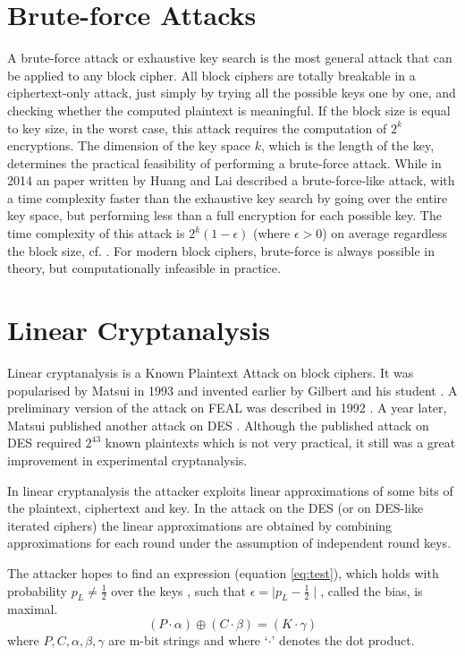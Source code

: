 \section{Brute-force Attacks}
A brute-force attack or exhaustive key search is the most general attack that can be applied to any block cipher. All block ciphers are totally breakable in a ciphertext-only attack, just simply by trying all the possible keys one by one, and checking whether the computed plaintext is meaningful. If the block size is equal to key size, in the worst case, this attack requires the computation of $2^{k}$ encryptions. The dimension of the key space $k$, which is the length of the key, determines the practical feasibility of performing a brute-force attack. While in 2014 an paper written by Huang and Lai \cite{huang2014effective} described a brute-force-like attack, with a time complexity faster than the exhaustive key search by going over the entire key space, but performing less than a full encryption for each possible key. The time complexity of this attack is $2^k(1 - \epsilon)$ (where $\epsilon > 0$) on average regardless the block size, cf. \cite{huang2014effective,gostac}. For modern block ciphers, brute-force is always possible in theory, but computationally infeasible in practice.
\section{Linear Cryptanalysis}
Linear cryptanalysis is a Known Plaintext Attack on block ciphers. It was popularised by Matsui in 1993 \cite{matsui1994linear} and invented earlier by Gilbert and his student \cite{tardy1991known}. A preliminary version of the attack on FEAL was described in 1992 \cite{matsui1993new}. A year later, Matsui published another attack on DES \cite{matsui1994linear}. Although the published attack on DES required $2^{43}$ known plaintexts which is not very practical, it still was a great improvement in experimental cryptanalysis. 

In linear cryptanalysis the attacker exploits linear approximations of some bits of the plaintext, ciphertext and key. In the attack on the DES (or on DES-like iterated ciphers) the linear approximations are obtained by combining approximations for each round under the assumption of independent round keys. 

The attacker hopes to find an expression (equation \ref{eq:test}), which holds with probability $p_{L} \neq \frac{1}{2}$ over the keys \cite{matsui1994linear}, such that $\epsilon = \mid p_{L} - \frac{1}{2} \mid$, called the bias, is maximal. 
\begin{equation} \label{eq:test}
(P\cdot\alpha)\oplus(C\cdot\beta)=(K\cdot\gamma)
\end{equation}
where $P,C,\alpha,\beta,\gamma$ are m-bit strings and where `$\cdot$' denotes the dot product.

